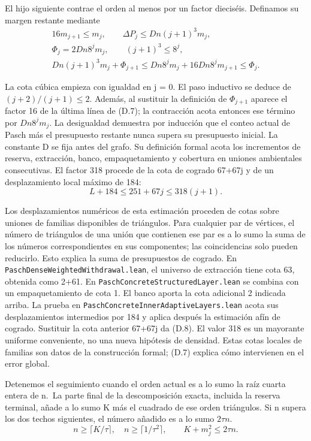 \documentclass[spanish,11pt,a4paper]{article}
\begin{document}
El hijo siguiente contrae el orden al menos por un factor dieciséis. Definamos su margen restante mediante
\[\begin{gathered}16m_{j+1}\leq m_j,\qquad \Delta P_j\leq Dn(j+1)^3m_j,\\ \Phi_j=2Dn8^jm_j,\qquad (j+1)^3\leq8^j,\\ Dn(j+1)^3m_j+\Phi_{j+1}\leq Dn8^jm_j+16Dn8^jm_{j+1}\leq\Phi_j.\end{gathered}\tag{D.7}\]

La cota cúbica empieza con igualdad en j = 0. El paso inductivo se deduce de \((j+2)/(j+1)\leq2\). Además, al sustituir la definición de \(\Phi_{j+1}\) aparece el factor 16 de la última línea de (D.7); la contracción acota entonces ese término por \(Dn8^jm_j\). La desigualdad demuestra por inducción que el conteo actual de Pasch más el presupuesto restante nunca supera su presupuesto inicial. La constante D se fija antes del grafo. Su definición formal acota los incrementos de reserva, extracción, banco, empaquetamiento y cobertura en uniones ambientales consecutivas. El factor 318 procede de la cota de cogrado 67+67j y de un desplazamiento local máximo de 184:
\[L+184\leq251+67j\leq318(j+1).\tag{D.8}\]

Los desplazamientos numéricos de esta estimación proceden de cotas sobre uniones de familias disponibles de triángulos. Para cualquier par de vértices, el número de triángulos de una unión que contienen ese par es a lo sumo la suma de los números correspondientes en sus componentes; las coincidencias solo pueden reducirlo. Esto explica la suma de presupuestos de cogrado. En \texttt{Pasch\allowbreak{}Dense\allowbreak{}Weighted\allowbreak{}Withdrawal.\allowbreak{}lean}, el universo de extracción tiene cota 63, obtenida como 2+61. En \texttt{Pasch\allowbreak{}Concrete\allowbreak{}Structured\allowbreak{}Layer.\allowbreak{}lean} se combina con un empaquetamiento de cota 1. El banco aporta la cota adicional 2 indicada arriba. La prueba en \texttt{Pasch\allowbreak{}Concrete\allowbreak{}Inner\allowbreak{}Adaptive\allowbreak{}Layers.\allowbreak{}lean} acota sus desplazamientos intermedios por 184 y aplica después la estimación afín de cogrado. Sustituir la cota anterior 67+67j da (D.8). El valor 318 es un mayorante uniforme conveniente, no una nueva hipótesis de densidad. Estas cotas locales de familias son datos de la construcción formal; (D.7) explica cómo intervienen en el error global.

Detenemos el seguimiento cuando el orden actual es a lo sumo la raíz cuarta entera de n.~La parte final de la descomposición exacta, incluida la reserva terminal, añade a lo sumo K más el cuadrado de ese orden triángulos. Si n supera los dos techos siguientes, el número añadido es a lo sumo \(2\tau n\).
\[n\geq\lceil K/\tau\rceil,\quad n\geq\lceil1/\tau^2\rceil,\qquad K+m_j^2\leq2\tau n.\tag{D.9}\]
\end{document}
